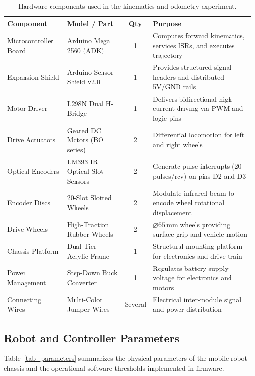 \documentclass[11pt,a4paper]{article}
\begin{document}
\vspace{0.2cm}
\begin{table}[H]
\centering
\small
\renewcommand{\arraystretch}{0.88}
\begin{tabularx}{\textwidth}{@{}llcX@{}}
\toprule
\textbf{Component} & \textbf{Model / Part} & \textbf{Qty} & \textbf{Purpose} \\
\midrule
Microcontroller Board & Arduino Mega 2560 (ADK) & 1 & Computes forward kinematics, services ISRs, and executes trajectory \\
Expansion Shield & Arduino Sensor Shield v2.0 & 1 & Provides structured signal headers and distributed 5V/GND rails \\
Motor Driver & L298N Dual H-Bridge & 1 & Delivers bidirectional high-current driving via PWM and logic pins \\
Drive Actuators & Geared DC Motors (BO series) & 2 & Differential locomotion for left and right wheels \\
Optical Encoders & LM393 IR Optical Slot Sensors & 2 & Generate pulse interrupts (20 pulses/rev) on pins D2 and D3 \\
Encoder Discs & 20-Slot Slotted Wheels & 2 & Modulate infrared beam to encode wheel rotational displacement \\
Drive Wheels & High-Traction Rubber Wheels & 2 & $\varnothing 65\,\text{mm}$ wheels providing surface grip and vehicle motion \\
Chassis Platform & Dual-Tier Acrylic Frame & 1 & Structural mounting platform for electronics and drive train \\
Power Management & Step-Down Buck Converter & 1 & Regulates battery supply voltage for electronics and motors \\
Connecting Wires & Multi-Color Jumper Wires & Several & Electrical inter-module signal and power distribution \\
\bottomrule
\end{tabularx}
\caption{Hardware components used in the kinematics and odometry experiment.}
\label{tab_components}
\end{table}

\newpage
\subsection{Robot and Controller Parameters}
Table~\ref{tab_parameters} summarizes the physical parameters of the mobile robot chassis and the operational software thresholds implemented in firmware.
\end{document}
